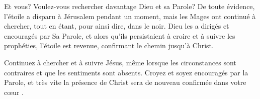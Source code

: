 Et vous? Voulez-vous rechercher davantage Dieu et sa Parole? De toute évidence, l'étoile a disparu à Jérusalem pendant un moment, mais les Mages ont continué à chercher, tout en étant, pour ainsi dire, dans le noir. Dieu les a dirigés et encouragés par Sa Parole, et alors qu'ils persistaient à croire et à suivre les prophéties, l'étoile est revenue, confirmant le chemin jusqu'à Christ.

Continuez à chercher et à suivre Jésus, même lorsque les circonstances sont contraires et que les sentiments sont absents. Croyez et soyez encouragés par la Parole, et très vite la présence de Christ sera de nouveau confirmée dans votre cœur .


\begin{dvquotes}
\end{dvquotes}
